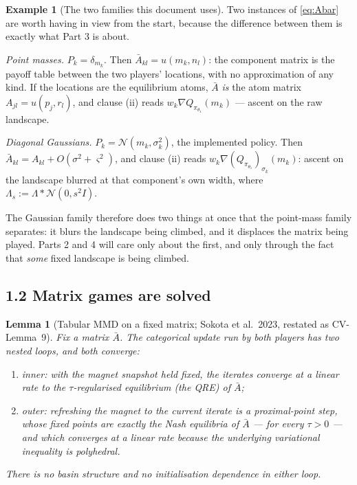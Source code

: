 \documentclass[11pt]{article}
\newtheorem{lemma}[theorem]{Lemma}
\theoremstyle{definition}
\newtheorem{example}[theorem]{Example}
\newcommand{\cN}{\mathcal{N}}
\newcommand{\CV}[1]{\textsf{CV-#1}}
\begin{document}
\begin{example}[The two families this document uses]\label{ex:families}
Two instances of \eqref{eq:Abar} are worth having in view from the start, because
the difference between them is exactly what Part 3 is about.

\emph{Point masses.} $P_k = \delta_{m_k}$. Then $\bar A_{kl} = u(m_k, n_l)$: the
component matrix is the payoff table between the two players' locations, with no
approximation of any kind. If the locations are the equilibrium atoms, $\bar A$
\emph{is} the atom matrix $A_{jl} = u(p_j, r_l)$, and clause (ii) reads
$w_k\nabla Q_{\pi_{\theta_1}}(m_k)$ --- ascent on the raw landscape.

\emph{Diagonal Gaussians.} $P_k = \cN(m_k, \sigma_k^2)$, the implemented policy.
Then $\bar A_{kl} = A_{kl} + O(\sigma^2 + \varsigma^2)$, and clause (ii) reads
$w_k \nabla (Q_{\pi_{\theta_1}})_{\sigma_k}(m_k)$: ascent on the landscape blurred
at that component's own width, where $\Lambda_s := \Lambda * \cN(0,s^2 I)$.

The Gaussian family therefore does two things at once that the point-mass family
separates: it blurs the landscape being climbed, and it displaces the matrix being
played. Parts 2 and 4 will care only about the first, and only through the fact
that \emph{some} fixed landscape is being climbed.
\end{example}

\subsection*{1.2 Matrix games are solved}

\begin{lemma}[Tabular MMD on a fixed matrix; Sokota et al.\ 2023,
restated as \CV{Lemma~9}]\label{lem:mmd}
Fix a matrix $\bar A$. The categorical update run by both players has two nested
loops, and both converge:
\begin{enumerate}
\item[(i)] \emph{inner}: with the magnet snapshot held fixed, the iterates
  converge at a linear rate to the $\tau$-regularised equilibrium (the QRE) of
  $\bar A$;
\item[(ii)] \emph{outer}: refreshing the magnet to the current iterate is a
  proximal-point step, whose fixed points are exactly the Nash equilibria of
  $\bar A$ --- for \emph{every} $\tau > 0$ --- and which converges at a linear rate
  because the underlying variational inequality is polyhedral.
\end{enumerate}
There is no basin structure and no initialisation dependence in either loop.
\end{lemma}
\end{document}
